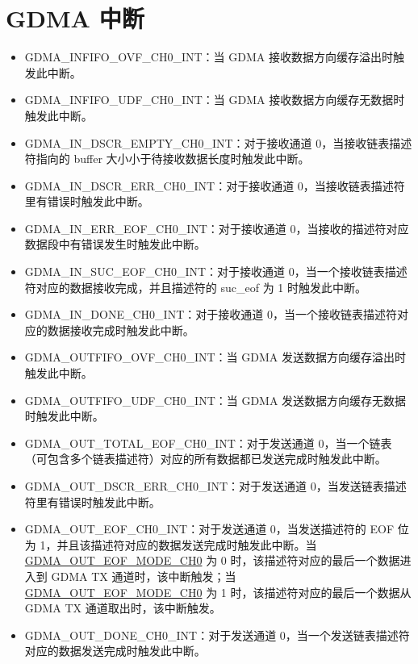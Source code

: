 \documentclass[main\_\_CN.tex]{subfiles}
\begin{document}
\section{GDMA 中断}
\begin{itemize}
\item \label{int:GDMAINFIFOOVFINT} GDMA\_INFIFO\_OVF\_CH0\_INT：当 GDMA 接收数据方向缓存溢出时触发此中断。
\item \label{int:GDMAINFIFOUDFINT}GDMA\_INFIFO\_UDF\_CH0\_INT：当 GDMA 接收数据方向缓存无数据时触发此中断。
\item \label{int:GDMAINDSCREMPTYINT}GDMA\_IN\_DSCR\_EMPTY\_CH0\_INT：对于接收通道 0，当接收链表描述符指向的 buffer 大小小于待接收数据长度时触发此中断。
\item \label{int:GDMAINDSCRERRINT}GDMA\_IN\_DSCR\_ERR\_CH0\_INT：对于接收通道 0，当接收链表描述符里有错误时触发此中断。
\item \label{int:GDMAINERREOFINT}GDMA\_IN\_ERR\_EOF\_CH0\_INT：对于接收通道 0，当接收的描述符对应数据段中有错误发生时触发此中断。
\item \label{int:GDMAINSUCEOFINT}GDMA\_IN\_SUC\_EOF\_CH0\_INT：对于接收通道 0，当一个接收链表描述符对应的数据接收完成，并且描述符的 suc\_eof 为 1 时触发此中断。
\item \label{int:GDMAINDONEINT}GDMA\_IN\_DONE\_CH0\_INT：对于接收通道 0，当一个接收链表描述符对应的数据接收完成时触发此中断。
\item \label{int:GDMAOUTFIFOOVFINT} GDMA\_OUTFIFO\_OVF\_CH0\_INT：当 GDMA 发送数据方向缓存溢出时触发此中断。
\item \label{int:GDMAOUTFIFOUDFINT}GDMA\_OUTFIFO\_UDF\_CH0\_INT：当 GDMA 发送数据方向缓存无数据时触发此中断。
\item \label{int:GDMAOUTTOTALEOFINT}GDMA\_OUT\_TOTAL\_EOF\_CH0\_INT：对于发送通道 0，当一个链表（可包含多个链表描述符）对应的所有数据都已发送完成时触发此中断。
\item \label{int:GDMAOUTDSCRERRINT}GDMA\_OUT\_DSCR\_ERR\_CH0\_INT：对于发送通道 0，当发送链表描述符里有错误时触发此中断。
\item \label{int:GDMAOUTEOFINT}GDMA\_OUT\_EOF\_CH0\_INT：对于发送通道 0，当发送描述符的 EOF 位为 1，并且该描述符对应的数据发送完成时触发此中断。当 \hyperref[fielddesc:GDMAOUTEOFMODECH0]{GDMA\_OUT\_EOF\_MODE\_CH0} 为 0 时，该描述符对应的最后一个数据进入到 GDMA TX 通道时，该中断触发；当 \hyperref[fielddesc:GDMAOUTEOFMODECH0]{GDMA\_OUT\_EOF\_MODE\_CH0} 为 1 时，该描述符对应的最后一个数据从 GDMA TX 通道取出时，该中断触发。
\item \label{int:GDMAOUTDONEINT}GDMA\_OUT\_DONE\_CH0\_INT：对于发送通道 0，当一个发送链表描述符对应的数据发送完成时触发此中断。
\end{itemize}
\end{document}
